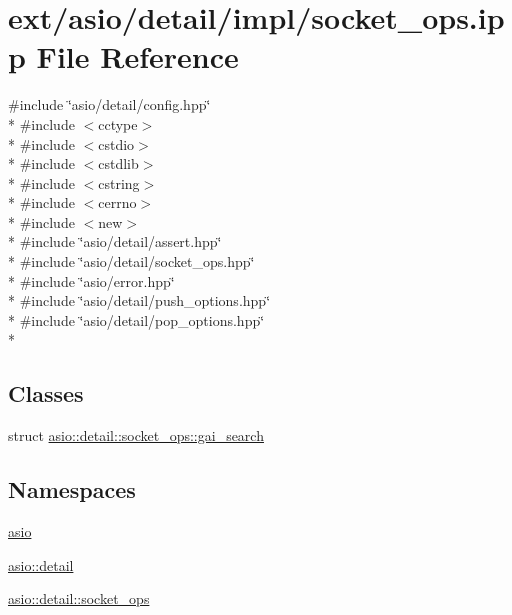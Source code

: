 \hypertarget{socket__ops_8ipp}{}\section{ext/asio/detail/impl/socket\+\_\+ops.ipp File Reference}
\label{socket__ops_8ipp}
{\ttfamily \#include \char`\"{}asio/detail/config.\+hpp\char`\"{}}\\*
{\ttfamily \#include $<$cctype$>$}\\*
{\ttfamily \#include $<$cstdio$>$}\\*
{\ttfamily \#include $<$cstdlib$>$}\\*
{\ttfamily \#include $<$cstring$>$}\\*
{\ttfamily \#include $<$cerrno$>$}\\*
{\ttfamily \#include $<$new$>$}\\*
{\ttfamily \#include \char`\"{}asio/detail/assert.\+hpp\char`\"{}}\\*
{\ttfamily \#include \char`\"{}asio/detail/socket\+\_\+ops.\+hpp\char`\"{}}\\*
{\ttfamily \#include \char`\"{}asio/error.\+hpp\char`\"{}}\\*
{\ttfamily \#include \char`\"{}asio/detail/push\+\_\+options.\+hpp\char`\"{}}\\*
{\ttfamily \#include \char`\"{}asio/detail/pop\+\_\+options.\+hpp\char`\"{}}\\*
\subsection*{Classes}
\begin{DoxyCompactItemize}
\item 
struct \hyperlink{structasio_1_1detail_1_1socket__ops_1_1gai__search}{asio\+::detail\+::socket\+\_\+ops\+::gai\+\_\+search}
\end{DoxyCompactItemize}
\subsection*{Namespaces}
\begin{DoxyCompactItemize}
\item 
 \hyperlink{namespaceasio}{asio}
\item 
 \hyperlink{namespaceasio_1_1detail}{asio\+::detail}
\item 
 \hyperlink{namespaceasio_1_1detail_1_1socket__ops}{asio\+::detail\+::socket\+\_\+ops}
\end{DoxyCompactItemize}
